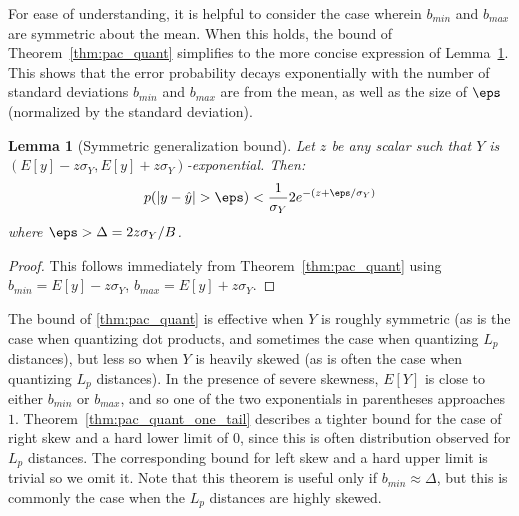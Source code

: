 \documentclass[]{article}
\newtheorem{lemma}{Lemma}[section]
\begin{document}

For ease of understanding, it is helpful to consider the case wherein $b_{min}$ and $b_{max}$ are symmetric about the mean. When this holds, the bound of Theorem~\ref{thm:pac_quant} simplifies to the more concise expression of Lemma~\ref{thm:pac_quant_z}. This shows that the error probability decays exponentially with the number of standard deviations $b_{min}$ and $b_{max}$ are from the mean, as well as the size of $\eps$ (normalized by the standard deviation).

\begin{lemma}[Symmetric generalization bound] \label{thm:pac_quant_z}
Let $z$ be any scalar such that $Y$ is $(E[y] - z \sigma_Y, E[y] + z \sigma_Y)$-exponential. Then:
\begin{align}
    p(|y - \hat{y}| > \eps) < \frac{1}{\sigma_Y} 2e^{-(z + \eps / \sigma_Y)}
\end{align}
where $\eps > \Delta = 2z\sigma_Y / B$.
\end{lemma}

\begin{proof}
This follows immediately from Theorem~\ref{thm:pac_quant} using $b_{min} = E[y] - z \sigma_Y$, $b_{max} = E[y] + z \sigma_Y$. %
\end{proof}

The bound of \ref{thm:pac_quant} is effective when $Y$ is roughly symmetric (as is the case when quantizing dot products, and sometimes the case when quantizing $L_p$ distances), but less so when $Y$ is heavily skewed (as is often the case when quantizing $L_p$ distances). In the presence of severe skewness, $E[Y]$ is close to either $b_{min}$ or $b_{max}$, and so one of the two exponentials in parentheses approaches $1$. Theorem~\ref{thm:pac_quant_one_tail} describes a tighter bound for the case of right skew and a hard lower limit of $0$, since this is often distribution observed for $L_p$ distances. The corresponding bound for left skew and a hard upper limit is trivial so we omit it. Note that this theorem is useful only if $b_{min} \approx \Delta$, but this is commonly the case when the $L_p$ distances are highly skewed.
\end{document}
